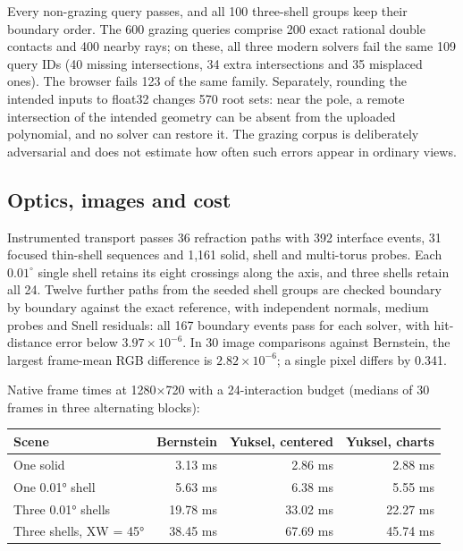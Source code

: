 \documentclass{jcgt}
\begin{document}
Every non-grazing query passes, and all 100 three-shell groups keep
their boundary order. The 600 grazing queries comprise 200 exact
rational double contacts and 400 nearby rays; on these, all three modern
solvers fail the same 109 query IDs (40 missing intersections, 34 extra
intersections and 35 misplaced ones). The browser fails 123 of the same
family. Separately, rounding the intended inputs to float32 changes 570
root sets: near the pole, a remote intersection of the intended geometry
can be absent from the uploaded polynomial, and no solver can restore
it. The grazing corpus is deliberately adversarial and does not estimate
how often such errors appear in ordinary views.

\subsection{Optics, images and cost}\label{optics-images-and-cost}

Instrumented transport passes 36 refraction paths with 392 interface
events, 31 focused thin-shell sequences and 1,161 solid, shell and
multi-torus probes. Each \(0.01^\circ\) single shell retains its eight
crossings along the axis, and three shells retain all 24. Twelve further
paths from the seeded shell groups are checked boundary by boundary
against the exact reference, with independent normals, medium probes and
Snell residuals: all 167 boundary events pass for each solver, with
hit-distance error below \(3.97\times10^{-6}\). In 30 image comparisons
against Bernstein, the largest frame-mean RGB difference is
\(2.82\times10^{-6}\); a single pixel differs by 0.341.

Native frame times at 1280×720 with a 24-interaction budget (medians of
30 frames in three alternating blocks):

{
\begin{longtable}[]{@{}lrrr@{}}
\toprule\noalign{}
Scene & Bernstein & Yuksel, centered & Yuksel, charts \\
\midrule\noalign{}
\endhead
\bottomrule\noalign{}
\endlastfoot
One solid & 3.13 ms & 2.86 ms & 2.88 ms \\
One 0.01° shell & 5.63 ms & 6.38 ms & 5.55 ms \\
Three 0.01° shells & 19.78 ms & 33.02 ms & 22.27 ms \\
Three shells, XW = 45° & 38.45 ms & 67.69 ms & 45.74 ms \\
\end{longtable}
}
\end{document}
